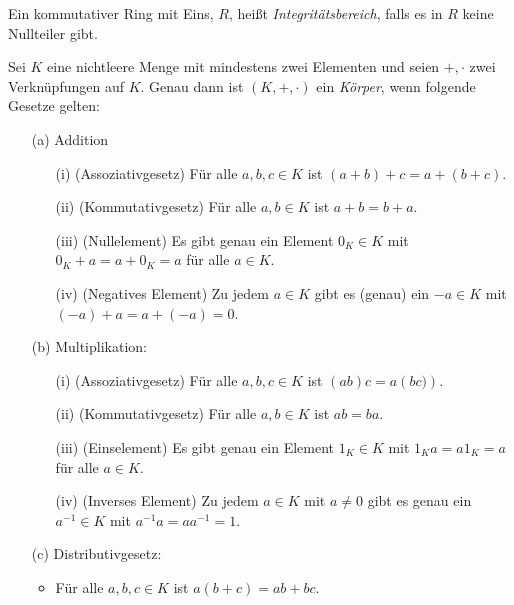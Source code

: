 \begin{defn} \label{Integritätsbereich}
Ein kommutativer Ring mit Eins, $R$, heißt \textit{Integritätsbereich}, falls es in $R$ keine Nullteiler gibt.
\end{defn}
%
%
%
%
%
%
% 
%
%
% 
\begin{defn}
Sei $K$ eine nichtleere Menge mit mindestens zwei Elementen und seien $+, \cdot$ zwei Verknüpfungen auf $K$. Genau dann ist $\left(K, +, \cdot\right)$ ein \textit{Körper}, wenn folgende Gesetze gelten:
\begin{enumerate}
\item[(a)] Addition
\begin{enumerate}
\item[(i)] (Assoziativgesetz) Für alle $a, b, c \in K$ ist $\left(a + b \right) + c = a + \left(b +c\right)$.
\item[(ii)] (Kommutativgesetz) Für alle $a, b \in K$ ist $a+b = b + a$.
\item[(iii)] (Nullelement) Es gibt genau ein Element $0_K \in K$ mit $0_K + a = a + 0_K = a$ für alle $a \in K$.
\item[(iv)] (Negatives Element) Zu jedem $a \in K$ gibt es (genau) ein $-a \in K$ mit $\left(-a\right)+ a = a + \left(-a\right)= 0$.
\end{enumerate} 
\item[(b)] Multiplikation:
\begin{enumerate}
\item[(i)] (Assoziativgesetz) Für alle $a, b, c \in K$ ist $\left(ab\right)c = a\left(bc)\right)$.
\item[(ii)] (Kommutativgesetz) Für alle $a, b \in K$ ist $ab = ba$.
\item[(iii)] (Einselement) Es gibt genau ein Element $1_K \in K$ mit $1_K a = a 1_K = a$ für alle $a \in K$.
\item[(iv)] (Inverses Element) Zu jedem $a \in K$ mit $a\neq 0 $ gibt es genau ein $a^{-1} \in K$ mit $a^{-1} a = a a^{-1} = 1$.
\end{enumerate}
\item[(c)] Distributivgesetz:
\begin{itemize}
\item Für alle $a, b, c \in K$ ist $a\left(b +c\right) = ab + bc$.
\end{itemize}
\end{enumerate}
\end{defn}



